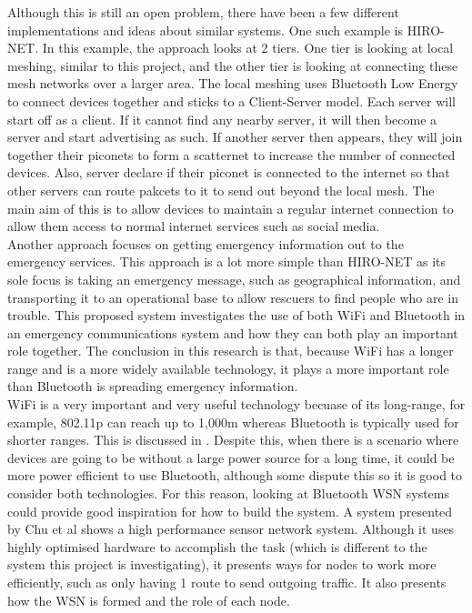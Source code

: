 \documentclass{report}
\begin{document}
Although this is still an open problem, there have been a few different implementations and ideas about similar systems. One such example is 
HIRO-NET\cite{ferranti2019hiro}. In this example, the approach looks at 2 tiers. One tier is looking at local meshing, similar to this project, 
and the other tier is looking at connecting these mesh networks over a larger area. The local meshing uses Bluetooth Low Energy to connect 
devices together and sticks to a Client-Server model. Each server will start off as a client. If it cannot find any nearby server, it will then 
become a server and start advertising as such. If another server then appears, they will join together their piconets to form a scatternet 
to increase the number of connected devices. Also, server declare if their piconet is connected to the internet so that other servers can route 
pakcets to it to send out beyond the local mesh. The main aim of this is to allow devices to maintain a regular internet connection to allow them 
access to normal internet services such as social media. 
\bigskip\\
Another approach focuses on getting emergency information out to the emergency services\cite{wu2011emergency}. This approach is a lot more simple than 
HIRO-NET as its sole focus is taking an emergency message, such as geographical information, and transporting it to an operational base to allow rescuers 
to find people who are in trouble. This proposed system investigates the use of both WiFi and Bluetooth in an emergency communications system and how they 
can both play an important role together. The conclusion in this research is that, because WiFi has a longer range and is a more widely available technology, 
it plays a more important role than Bluetooth is spreading emergency information. 
\bigskip\\
WiFi is a very important and very useful technology becuase of its long-range, for example, 802.11p can reach up to 1,000m \cite{abdelgader2014physical} whereas Bluetooth
is typically used for shorter ranges. This is discussed in \cite{bhagwat2001bluetooth}. Despite this, when there is a scenario 
where devices are going to be without a large power source for a long time, it could be more power efficient to use Bluetooth\cite{putra2017comparison}, although some 
dispute this \cite{friedman2012power} so it is good to consider both technologies. For this reason, looking at Bluetooth WSN systems could provide good inspiration for 
how to build the system. A system presented by Chu et al \cite{chu2010design} shows a high performance sensor network system. Although it uses highly optimised hardware 
to accomplish the task (which is different to the system this project is investigating), it presents ways for nodes to work more efficiently, such as only having 1 
route to send outgoing traffic. It also presents how the WSN is formed and the role of each node. 
\end{document}

